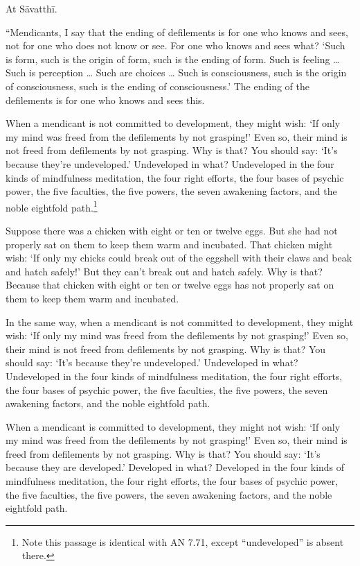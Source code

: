 \documentclass[12pt,openany]{book}%
\begin{document}
At \textsanskrit{Sāvatthī}. 

“Mendicants, I say that the ending of defilements is for one who knows and sees, not for one who does not know or see. For one who knows and sees what? ‘Such is form, such is the origin of form, such is the ending of form. Such is feeling … Such is perception … Such are choices … Such is consciousness, such is the origin of consciousness, such is the ending of consciousness.’ The ending of the defilements is for one who knows and sees this. 

When a mendicant is not committed to development, they might wish: ‘If only my mind was freed from the defilements by not grasping!’ Even so, their mind is not freed from defilements by not grasping. Why is that? You should say: ‘It’s because they’re undeveloped.’ Undeveloped in what? Undeveloped in the four kinds of mindfulness meditation, the four right efforts, the four bases of psychic power, the five faculties, the five powers, the seven awakening factors, and the noble eightfold path.\footnote{Note this passage is identical with AN 7.71, except “undeveloped” is absent there. } 

Suppose there was a chicken with eight or ten or twelve eggs. But she had not properly sat on them to keep them warm and incubated. That chicken might wish: ‘If only my chicks could break out of the eggshell with their claws and beak and hatch safely!’ But they can’t break out and hatch safely. Why is that? Because that chicken with eight or ten or twelve eggs has not properly sat on them to keep them warm and incubated. 

In the same way, when a mendicant is not committed to development, they might wish: ‘If only my mind was freed from the defilements by not grasping!’ Even so, their mind is not freed from defilements by not grasping. Why is that? You should say: ‘It’s because they’re undeveloped.’ Undeveloped in what? Undeveloped in the four kinds of mindfulness meditation, the four right efforts, the four bases of psychic power, the five faculties, the five powers, the seven awakening factors, and the noble eightfold path. 

When a mendicant is committed to development, they might not wish: ‘If only my mind was freed from the defilements by not grasping!’ Even so, their mind is freed from defilements by not grasping. Why is that? You should say: ‘It’s because they are developed.’ Developed in what? Developed in the four kinds of mindfulness meditation, the four right efforts, the four bases of psychic power, the five faculties, the five powers, the seven awakening factors, and the noble eightfold path. 
\end{document}
